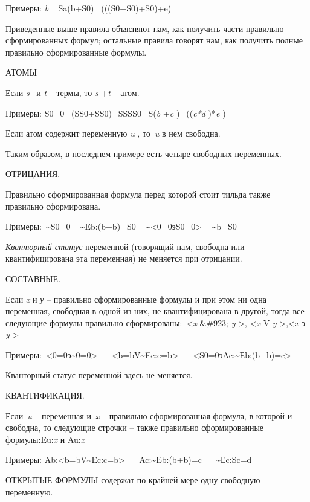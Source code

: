 \documentclass[../main.tex]{subfiles}
\begin{document}
Примеры: \emph{b} ~ Sa(b+S0) ~(((S0+S0)+S0)+e)

Приведенные выше правила объясняют нам, как получить части правильно сформированных формул; остальные правила говорят нам, как получить полные правильно сформированные формулы.

АТОМЫ

Если \emph{s} ~и \emph{t} \--- термы, то \emph{s} +\emph{t} \--- атом.

Примеры: S0=0~ (SS0+SS0)=SSSS0~ S(\emph{b} +\emph{c} )=((\emph{c*d} )*\emph{e} )

Если атом содержит переменную \emph{u} , то~\emph{u} в нем свободна.

Таким образом, в последнем примере есть четыре свободных переменных.

ОТРИЦАНИЯ.

Правильно сформированная формула перед которой стоит тильда также правильно сформирована.

Примеры:~\textasciitilde S0=0 ~ \textasciitilde Eb:(b+b)=S0 ~ \textasciitilde\textless0=0эS0=0\textgreater{} ~ \textasciitilde b=S0

\emph{Кванторный статус} переменной (говорящий нам, свободна или квантифицирована эта переменная) не меняется при отрицании.

СОСТАВНЫЕ.

Если \emph{x} и \emph{у} \--- правильно сформированные формулы и при этом ни одна переменная, свободная в одной из них, не квантифицирована в другой, тогда все следующие формулы правильно сформированы:~\textless{}\emph{x} \&\#923; \emph{y} \textgreater, \textless{}\emph{x} V \emph{y} \textgreater,\textless{}\emph{x} э \emph{y} \textgreater{}

Примеры:~\textless0=0э\textasciitilde0=0\textgreater{} ~~ \textless b=bV\textasciitilde Ec:c=b\textgreater{} ~~ \textless S0=0эAc:\textasciitilde Еb:(b+b)=c\textgreater{}

Кванторный статус переменной здесь не меняется.

КВАНТИФИКАЦИЯ.

Если~\emph{u} \--- переменная и~\emph{x} \--- правильно сформированная формула, в которой и свободна, то следующие строчки \--- также правильно сформированные формулы:Eu:\emph{x} и Au:\emph{x}

Примеры: Ab:\textless b=bV\textasciitilde Ec:c=b\textgreater{} ~~ Ac:\textasciitilde Eb:(b+b)=c ~~ \textasciitilde Еc:Sc=d

ОТКРЫТЫЕ ФОРМУЛЫ содержат по крайней мере одну свободную переменную.
\end{document}
